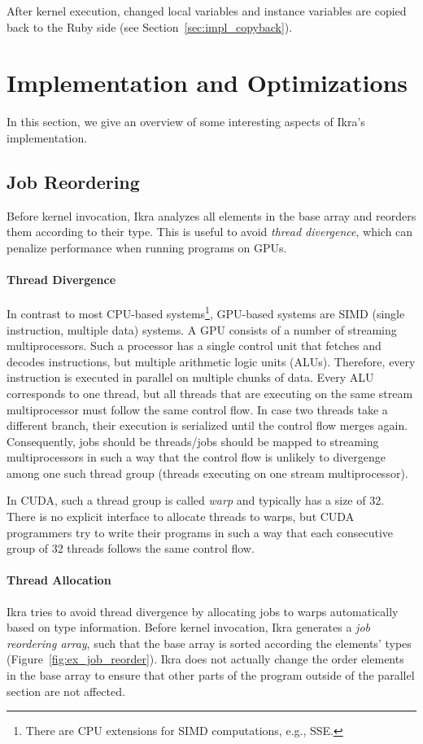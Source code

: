 \documentclass[preprint]{sigplanconf}
\begin{document}
After kernel execution, changed local variables and instance variables are copied back to the Ruby side (see Section~\ref{sec:impl_copyback}).


\section{Implementation and Optimizations}
In this section, we give an overview of some interesting aspects of Ikra's implementation.

\subsection{Job Reordering}
Before kernel invocation, Ikra analyzes all elements in the base array and reorders them according to their type. This is useful to avoid \emph{thread divergence}, which can penalize performance when running programs on GPUs.

\paragraph{Thread Divergence}
In contrast to most CPU-based systems\footnote{There are CPU extensions for SIMD computations, e.g., SSE.}, GPU-based systems are SIMD (single instruction, multiple data) systems. A GPU consists of a number of streaming multiprocessors. Such a processor has a single control unit that fetches and decodes instructions, but multiple arithmetic logic units (ALUs). Therefore, every instruction is executed in parallel on multiple chunks of data. Every ALU corresponds to one thread, but all threads that are executing on the same stream multiprocessor must follow the same control flow. In case two threads take a different branch, their execution is serialized until the control flow merges again. Consequently, jobs should be threads/jobs should be mapped to streaming multiprocessors in such a way that the control flow is unlikely to divergenge among one such thread group (threads executing on one stream multiprocessor).

In CUDA, such a thread group is called \emph{warp} and typically has a size of 32. There is no explicit interface to allocate threads to warps, but CUDA programmers try to write their programs in such a way that each consecutive group of 32 threads follows the same control flow.

\paragraph{Thread Allocation}
Ikra tries to avoid thread divergence by allocating jobs to warps automatically based on type information. Before kernel invocation, Ikra generates a \emph{job reordering array}, such that the base array is sorted according the elements' types (Figure~\ref{fig:ex_job_reorder}). Ikra does not actually change the order elements in the base array to ensure that other parts of the program outside of the parallel section are not affected.
\end{document}
